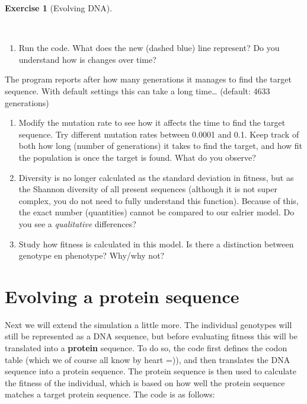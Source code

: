 \documentclass[
  letterpaper,
  DIV=11,
  numbers=noendperiod]{scrreprt}
\providecommand{\tightlist}{%
  \setlength{\itemsep}{0pt}\setlength{\parskip}{0pt}}\usepackage{longtable,booktabs,array}
\theoremstyle{definition}
\newtheorem{exercise}{Exercise}[chapter]
\theoremstyle{remark}
\begin{document}
\begin{exercise}[Evolving
DNA]\protect\hypertarget{exr-evolving-dna}{}\label{exr-evolving-dna}

~

\begin{enumerate}
\def\labelenumi{\alph{enumi}.}
\tightlist
\item
  Run the code. What does the new (dashed blue) line represent? Do you
  understand how is changes over time?
\end{enumerate}

The program reports after how many generations it manages to find the
target sequence. With default settings this can take a long time\ldots{}
(default: 4633 generations)

\begin{enumerate}
\def\labelenumi{\alph{enumi}.}
\setcounter{enumi}{1}
\tightlist
\item
  Modify the mutation rate to see how it affects the time to find the
  target sequence. Try different mutation rates between 0.0001 and 0.1.
  Keep track of both how long (number of generations) it takes to find
  the target, and how fit the population is once the target is found.
  What do you observe?
\item
  Diversity is no longer calculated as the standard deviation in
  fitness, but as the Shannon diversity of all present sequences
  (although it is not super complex, you do not need to fully understand
  this function). Because of this, the exact number (quantities) cannot
  be compared to our ealrier model. Do you see a \emph{qualitative}
  differences?
\item
  Study how fitness is calculated in this model. Is there a distinction
  between genotype en phenotype? Why/why not?
\end{enumerate}

\end{exercise}

\section{Evolving a protein sequence}\label{evolving-a-protein-sequence}

Next we will extend the simulation a little more. The individual
genotypes will still be represented as a DNA sequence, but before
evaluating fitness this will be translated into a \textbf{protein}
sequence. To do so, the code first defines the codon table (which we of
course all know by heart =)), and then translates the DNA sequence into
a protein sequence. The protein sequence is then used to calculate the
fitness of the individual, which is based on how well the protein
sequence matches a target protein sequence. The code is as follows:
\end{document}
